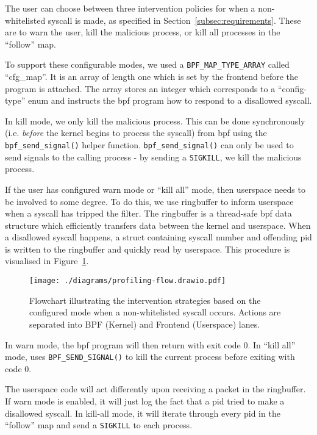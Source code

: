 The user can choose between three intervention policies for when a
non-whitelisted syscall is made, as specified in 
Section~\ref{subsec:requirements}. These are to warn the user, kill the
malicious process, or kill all processes in the ``follow'' map.

To support these configurable modes, we used a \texttt{BPF\_MAP\_TYPE\_ARRAY}
called ``cfg\_map''. It is an array of length one which is set by the frontend
before the program is attached. The array stores an integer which corresponds to
a ``config-type'' enum and instructs the \ac{bpf} program how to respond to a
disallowed syscall.

In kill mode, we only kill the malicious process. This can be done synchronously
(i.e. \textit{before} the kernel begins to process the syscall) from \ac{bpf}
using the \texttt{bpf\_send\_signal()} helper function. 
\texttt{bpf\_send\_signal()} can only be used to send signals to the calling
process - by sending a \texttt{SIGKILL}, we kill the malicious process.

If the user has configured warn mode or ``kill all'' mode, then userspace needs
to be involved to some degree. To do this, we use  ringbuffer to inform
userspace when a syscall has tripped the filter. The ringbuffer is a thread-safe
\ac{bpf} data structure which efficiently transfers data between the kernel and
userspace. When a disallowed syscall happens, a struct containing syscall
number and offending \ac{pid} is written to the ringbuffer and quickly read by
userspace. This procedure is visualised in Figure~\ref{fig:intervention-flowchart}.

\begin{figure}[htbp]
\centering
\texttt{[image: ./diagrams/profiling-flow.drawio.pdf]} 
\caption{Flowchart illustrating the intervention strategies based on the configured mode when a non-whitelisted syscall occurs. Actions are separated into BPF (Kernel) and Frontend (Userspace) lanes.}
\label{fig:intervention-flowchart}
\end{figure}

In warn mode, the \ac{bpf} program will then return with exit code 0. In ``kill
all'' mode, \af uses \texttt{BPF\_SEND\_SIGNAL()} to kill the current process
before exiting with code 0.

The userspace code will act differently upon receiving a packet in the
ringbuffer. If warn mode is enabled, it will just log the fact that a \ac{pid}
tried to make a disallowed syscall. In kill-all mode, it will iterate through
every \ac{pid} in the ``follow'' map and send a \texttt{SIGKILL} to each
process.

